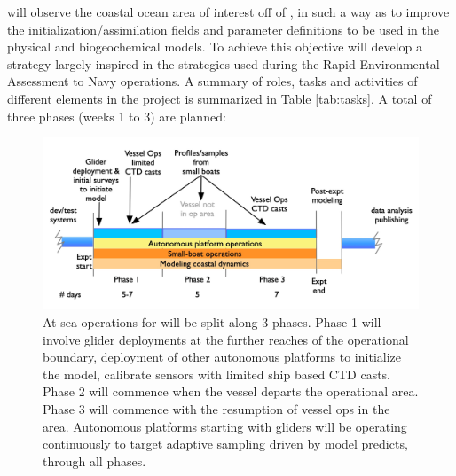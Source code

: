 \proj will observe the coastal ocean area of interest off of \naze, in
such a way as to improve the initialization/assimilation fields and
parameter definitions to be used in the physical and biogeochemical
models. To achieve this objective \proj will develop a strategy
largely inspired in the strategies used during the Rapid Environmental
Assessment to Navy operations. A summary of roles, tasks and
activities of different elements in the project is summarized in Table
\ref{tab:tasks}. A total of three phases (weeks 1 to 3) are planned:

\begin{figure}[!t]
  \vspace{-0.5cm}
  \centering
  \includegraphics[scale=0.25]{fig/timelines.jpg}
  \caption{At-sea operations for \proj will be split along 3 phases.
    Phase 1 will involve glider deployments at the further reaches of
    the operational boundary, deployment of other autonomous platforms
    to initialize the model, calibrate sensors with limited ship based
    CTD casts. Phase 2 will commence when the vessel departs the \naz
    operational area. Phase 3 will commence with the resumption of
    vessel ops in the \naz area. Autonomous platforms starting with
    gliders will be operating continuously to target adaptive sampling
    driven by model predicts, through all phases.}
  \vspace{-0.3cm}
 \label{fig:expt-phases}
\end{figure}

 
